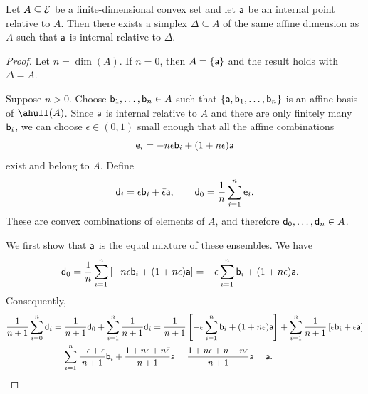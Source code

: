 \begin{mathSection}
	\begin{prop}\label{pm-es-internalPointSimplex}
		Let $A \subseteq \Ens$ be a finite-dimensional convex set and let $\ens[a]$ be an internal point relative to $A$. Then there exists a simplex $\Delta \subseteq A$ of the same affine dimension as $A$ such that $\ens[a]$ is internal relative to $\Delta$.
	\end{prop}
	
	\begin{proof}
		Let $n = \dim(A)$. If $n=0$, then $A = \{\ens[a]\}$ and the result holds with $\Delta=A$.
		
		Suppose $n>0$. Choose $\ens[b]_1, \dots, \ens[b]_n \in A$ such that $\{\ens[a], \ens[b]_1, \dots, \ens[b]_n\}$ is an affine basis of $\ahull(A)$. Since $\ens[a]$ is internal relative to $A$ and there are only finitely many $\ens[b]_i$, we can choose $\epsilon \in (0,1)$ small enough that all the affine combinations
		\begin{equation}
			\ens[e]_i = -n\epsilon\ens[b]_i + (1+n\epsilon)\ens[a]
		\end{equation}
		exist and belong to $A$. Define
		\begin{equation}
			\ens[d]_i = \epsilon\ens[b]_i + \bar{\epsilon}\ens[a],
			\qquad
			\ens[d]_0 = \frac{1}{n}\sum_{i=1}^n \ens[e]_i.
		\end{equation}
		These are convex combinations of elements of $A$, and therefore $\ens[d]_0, \dots, \ens[d]_n \in A$.
		
		We first show that $\ens[a]$ is the equal mixture of these ensembles. We have
		\begin{equation}
			\begin{aligned}
				\ens[d]_0
				&= \frac{1}{n}\sum_{i=1}^n
				\left[-n\epsilon\ens[b]_i + (1+n\epsilon)\ens[a]\right] = -\epsilon\sum_{i=1}^n \ens[b]_i + (1+n\epsilon)\ens[a].
			\end{aligned}
		\end{equation}
		Consequently,
		\begin{equation}
			\begin{aligned}
				\frac{1}{n+1}\sum_{i=0}^n \ens[d]_i
				&= \frac{1}{n+1}\ens[d]_0
				+ \sum_{i=1}^n \frac{1}{n+1}\ens[d]_i = \frac{1}{n+1}
				\left[-\epsilon\sum_{i=1}^n \ens[b]_i + (1+n\epsilon)\ens[a]\right]
				+ \sum_{i=1}^n \frac{1}{n+1}
				\left[\epsilon\ens[b]_i + \bar{\epsilon}\ens[a]\right] \\
				&= \sum_{i=1}^n \frac{-\epsilon+\epsilon}{n+1}\ens[b]_i
				+ \frac{1+n\epsilon+n\bar{\epsilon}}{n+1}\ens[a] = \frac{1+n\epsilon+n-n\epsilon}{n+1}\ens[a] = \ens[a].
			\end{aligned}
		\end{equation}
		

\end{proof}
\end{mathSection}
